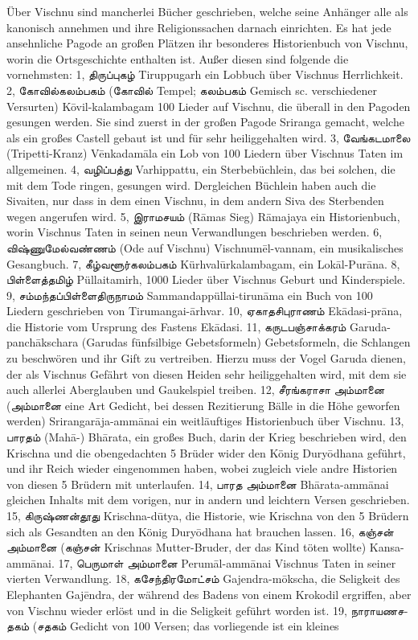 \documentclass{article}
\newcommand{\TamilText}[1]{\texttamil{#1}}
\newcommand{\tam}[1]{\TamilText{#1}}
\begin{document}
Über Vischnu sind mancherlei Bücher geschrieben, welche seine Anhänger alle als kanonisch annehmen und ihre Religionssachen darnach einrichten. Es hat jede ansehnliche Pagode an großen Plätzen ihr besonderes Historienbuch von Vischnu, worin die Ortsgeschichte enthalten ist. Außer diesen sind folgende die vornehmsten: 1, \tam{திருப்புகழ்} Tiruppugarh ein Lobbuch über Vischnus Herrlichkeit. 2, \tam{கோவில்கலம்பகம்} (\tam{கோவில்} Tempel; \tam{கலம்பகம்} Gemisch sc. verschiedener Versurten) K\={o}vil-kalambagam 100 Lieder auf Vischnu, die überall in den Pagoden gesungen werden. Sie sind zuerst in der großen Pagode Sriranga gemacht, welche als ein großes Castell gebaut ist und für sehr heiliggehalten wird. 3, \tam{வேங்கடமாலை} (Tripetti-Kranz) V\={e}nkadam\={a}la ein Lob von 100 Liedern über Vischnus Taten im allgemeinen. 4, \tam{வழிப்பத்து} Varhippattu, ein Sterbebüchlein, das bei solchen, die mit dem Tode ringen, gesungen wird. Dergleichen Büchlein haben auch die Sivaiten, nur dass in dem einen Vischnu, in dem andern Siva des Sterbenden wegen angerufen wird. 5, \tam{இராமசயம்} (R\={a}mas Sieg) R\={a}majaya ein Historienbuch, worin Vischnus Taten in seinen neun Verwandlungen beschrieben werden. 6, \tam{விஷ்ணுமேல்வண்ணம்} (Ode auf Vischnu) Vischnum\={e}l-vannam, ein musikalisches Gesangbuch. 7, \tam{கீழ்வளூர்கலம்பகம்} Kürhval\={u}rkalambagam, ein Lok\={a}l-Pur\={a}na. 8, \tam{பிள்ளைத்தமிழ்} Püllaitamirh, 1000 Lieder über Vischnus Geburt und Kinderspiele. 9, \tam{சம்மந்தப்பிள்ளைதிருநாமம்} Sammandappüllai-tirun\={a}ma ein Buch von 100 Liedern geschrieben von Tirumangai-\={a}rhvar. 10, \tam{ஏகாதசிபுராணம்} Ek\={a}dasi-pr\={a}na, die Historie vom Ursprung des Fastens Ek\={a}dasi. 11, \tam{கருடபஞ்சாக்கரம்} Garuda-panch\={a}kschara (Garudas fünfsilbige Gebetsformeln) Gebetsformeln, die Schlangen zu beschwören und ihr Gift zu vertreiben. Hierzu muss der Vogel Garuda dienen, der als Vischnus Gefährt von diesen Heiden sehr heiliggehalten wird, mit dem sie auch allerlei Aberglauben und Gaukelspiel treiben. 12, \tam{சீரங்கராசா} \tam{அம்மானை} (\tam{அம்மானை} eine Art Gedicht, bei dessen Rezitierung Bälle in die Höhe geworfen werden) Srirangar\={a}ja-amm\={a}nai ein weitläuftiges Historienbuch über Vischnu. 13, \tam{பாரதம்} (Mah\={a}-) Bh\={a}rata, ein großes Buch, darin der Krieg beschrieben wird, den Krischna und die obengedachten 5 Brüder wider den König Dury\={o}dhana geführt, und ihr Reich wieder eingenommen haben, wobei zugleich viele andre Historien von diesen 5 Brüdern mit unterlaufen. 14, \tam{பாரத} \tam{அம்மானை} Bh\={a}rata-amm\={a}nai gleichen Inhalts mit dem vorigen, nur in andern und leichtern Versen geschrieben. 15, \tam{கிருஷ்ணன்தூது} Krischna-d\={u}tya, die Historie, wie Krischna von den 5 Brüdern sich als Gesandten an den König Dury\={o}dhana hat brauchen lassen. 16, \tam{கஞ்சன்} \tam{அம்மானை} (\tam{கஞ்சன்} Krischnas Mutter-Bruder, der das Kind töten wollte) Kansa-amm\={a}nai. 17, \tam{பெருமாள்} \tam{அம்மானை} Perum\={a}l-amm\={a}nai Vischnus Taten in seiner vierten Verwandlung. 18, \tam{கசேந்திரமோட்சம்} Gajendra-m\={o}kscha, die Seligkeit des Elephanten Gaj\={e}ndra, der während des Badens von einem Krokodil ergriffen, aber von Vischnu wieder erlöst und in die Seligkeit geführt worden ist. 19, \tam{நாராயணசதகம்} (\tam{சதகம்} Gedicht von 100 Versen; das vorliegende ist ein kleines 
\end{document}
